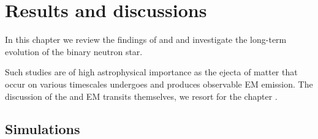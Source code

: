 
\chapter{Results and discussions} %

\label{Chapter4} %



In this chapter we review the findings of \citet{Nedora:2019jhl} and \citet{Nedora:2020pak}
and investigate the long-term \pmerg{} evolution of the binary neutron star. 

Such studies are of high astrophysical importance as the ejecta of matter that occur 
on various timescales \pmerg{} undergoes \rproc{} and produces observable EM emission. 
The discussion of the \rproc{} and EM transits themselves, we resort for the chapter .


\section{Simulations}







